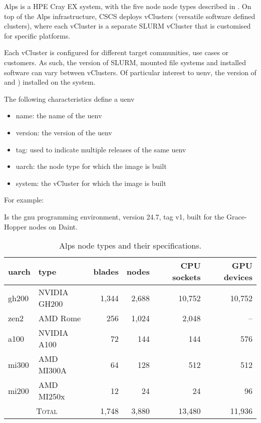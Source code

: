 Alps is a HPE Cray EX system, with the five node node types described in .
On top of the Alps infrastructure, CSCS deploys vClusters (versatile software defined clusters), where each vCluster is a separate SLURM vCluster that is customised for specific platforms.

Each vCluster is configured for different target communities, use cases or customers.
As such, the version of SLURM, mounted file systems and installed software can vary between vClusters.
Of particular interest to uenv, the version of \xpmemm and \libfabric) installed on the system.

The following characteristics define a uenv
\begin{itemize}
    \item name: the name of the uenv
    \item version: the version of the uenv
    \item tag: used to indicate multiple releases of the same uenv
    \item uarch: the node type for which the image is built
    \item system: the vCluster for which the image is built
\end{itemize}

For example: 

Is the gnu programming environment, version 24.7, tag v1, built for the Grace-Hopper nodes on Daint.

\begin{table*}[h!]
\centering
\begin{tabular}{llrrrr}
\toprule
uarch   & type         & blades & nodes & CPU sockets & GPU devices \\
\midrule
gh200   & NVIDIA GH200 & 1,344   & 2,688  & 10,752      & 10,752      \\
zen2    & AMD Rome     & 256     & 1,024  & 2,048       & --          \\
a100    & NVIDIA A100  & 72      & 144    & 144         & 576         \\
mi300   & AMD MI300A   & 64      & 128    & 512         & 512         \\
mi200   & AMD MI250x   & 12      & 24     & 24          & 96          \\
\midrule
\multicolumn{2}{c}{\textsc{Total}}      & 1,748   & 3,880  & 13,480  & 11,936 \\
\bottomrule
\end{tabular}
\caption{Alps node types and their specifications.}
\label{tab:alps-nodes}
\end{table*}

